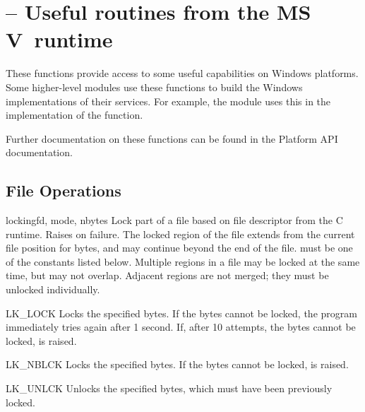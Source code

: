 \section{ --
         Useful routines from the MS V\Cpp\ runtime}



These functions provide access to some useful capabilities on Windows
platforms.  Some higher-level modules use these functions to build the 
Windows implementations of their services.  For example, the
 module uses this in the implementation of the
 function.

Further documentation on these functions can be found in the Platform
API documentation.


\subsection{File Operations \label{msvcrt-files}}

\begin{funcdesc}{locking}{fd, mode, nbytes}
  Lock part of a file based on file descriptor  from the C
  runtime.  Raises  on failure.  The locked region
  of the file extends from the current file position for 
  bytes, and may continue beyond the end of the file.   must
  be one of the  constants listed below.
  Multiple regions in a file may be locked at the same time, but may
  not overlap.  Adjacent regions are not merged; they must be unlocked
  individually.
\end{funcdesc}

\begin{datadesc}{LK_LOCK}
  Locks the specified bytes. If the bytes cannot be locked, the
  program immediately tries again after 1 second.  If, after 10
  attempts, the bytes cannot be locked,  is
  raised.
\end{datadesc}

\begin{datadesc}{LK_NBLCK}
  Locks the specified bytes. If the bytes cannot be locked,
   is raised.
\end{datadesc}

\begin{datadesc}{LK_UNLCK}
  Unlocks the specified bytes, which must have been previously locked. 
\end{datadesc}

